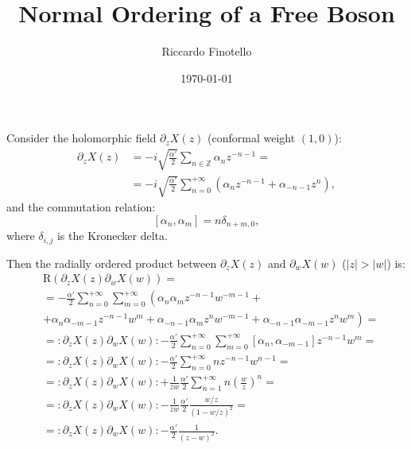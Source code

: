 \documentclass[10pt,a4paper]{article}
\author{Riccardo Finotello}
\title{Normal Ordering of a Free Boson}
\date{\today}
\begin{document}

    \maketitle

    Consider the holomorphic field $\partial_z X\left( z \right)$ (conformal
    weight $\left( 1, 0 \right)$):
    \begin{align*}
        \partial_z X\left( z \right) &= -i \sqrt{\frac{\alpha'}{2}}
        \sum\limits_{n \in \mathbb{Z}} \alpha_n z^{-n-1} =
        \\
        &= -i \sqrt{\frac{\alpha'}{2}} \sum\limits_{n = 0}^{+\infty} \left(
        \alpha_n z^{-n-1} + \alpha_{-n-1} z^n \right),
    \end{align*}
    and the commutation relation:
    \begin{equation*}
        \left[ \alpha_n, \alpha_m \right] = n \delta_{n+m,0},
    \end{equation*}
    where $\delta_{i,j}$ is the Kronecker delta.

    Then the radially ordered product between $\partial_z X\left( z \right)$
    and $\partial_w X\left( w \right)$ ($\left| z \right| > \left| w \right|$)
    is:
    \begin{align*}
        &\mathrm{R}\left( \partial_z X\left( z \right) \partial_w X\left( w
        \right) \right) =
        \\
        &= -\frac{\alpha'}{2} \sum\limits_{n = 0}^{+\infty} \sum\limits_{m =
        0}^{+\infty} \left( \alpha_n \alpha_m z^{-n-1} w^{-m-1} + \right.
        \\
        &\left. + \alpha_n \alpha_{-m-1} z^{-n-1}
        w^m + \alpha_{-n-1} \alpha_m z^n w^{-m-1} + \alpha_{-n-1} \alpha_{-m-1}
        z^n w^m \right) =
        \\
        &= \colon \partial_z X\left( z \right) \partial_w X\left( w \right)
        \colon - \frac{\alpha'}{2} \sum\limits_{n = 0}^{+\infty} \sum\limits_{m
        = 0}^{+\infty} \left[ \alpha_n, \alpha_{-m-1} \right] z^{-n-1} w^m =
        \\
        &= \colon \partial_z X\left( z \right) \partial_w X\left( w \right)
        \colon - \frac{\alpha'}{2} \sum\limits_{n = 0}^{+\infty} n z^{-n-1}
        w^{n-1} =
        \\
        &= \colon \partial_z X\left( z \right) \partial_w X\left( w \right)
        \colon + \frac{1}{zw} \frac{\alpha'}{2} \sum\limits_{n = 1}^{+\infty} n
        \left( \frac{w}{z} \right)^n =
        \\
        &= \colon \partial_z X\left( z \right) \partial_w X\left( w \right)
        \colon - \frac{1}{zw} \frac{\alpha'}{2} \frac{ w / z }{\left( 1 - w / z
        \right)^2} =
        \\
        &= \colon \partial_z X\left( z \right) \partial_w X\left( w \right)
        \colon - \frac{\alpha'}{2} \frac{1}{\left( z - w \right)^2}.
    \end{align*}
\end{document}

